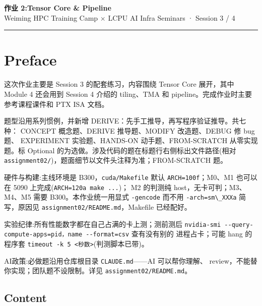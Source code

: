 \documentclass[11pt,a4paper,fontset=none]{ctexart}
\providecommand{\passthrough}[1]{#1}
\begin{document}
\begin{center}
  {\LARGE\bfseries 作业 2:Tensor Core \& Pipeline}\\[6pt]
  {\sffamily Weiming HPC Training Camp \(\times\) LCPU AI Infra Seminars
· Session 3 / 4}
\end{center}

\vspace{0.5em}
\hrule
\vspace{1em}

\setcounter{section}{-1}

\section*{Preface}\label{preface}

这次作业主要是 Session 3 的配套练习，内容围绕 Tensor Core 展开，其中
Module 4 还会用到 Session 4 介绍的 tiling、TMA 和
pipeline。完成作业时主要参考课程课件和 PTX ISA 文档。

题型沿用系列惯例，并新增 DERIVE：先手工推导，再写程序验证推导。共七种：
CONCEPT 概念题、DERIVE 推导题、MODIFY 改造题、DEBUG 修 bug 题、
EXPERIMENT 实验题、HANDS-ON 动手题、FROM-SCRATCH 从零实现题。标 Optional
的为选做。涉及代码的题在标题行右侧标出文件路径(相对
\passthrough{\lstinline!assignment02/!})，题面细节以文件头注释为准；FROM-SCRATCH
题。

硬件与构建:主线环境是 B300，\passthrough{\lstinline!cuda/Makefile!} 默认
\passthrough{\lstinline!ARCH=100f!}；M0、M1 也可以在 5090
上完成(\passthrough{\lstinline!ARCH=120a make ...!})； M2 的判测纯
host，无卡可判；M3、M4、M5 需要 B300。本作业统一用显式
\passthrough{\lstinline!-gencode!} 而不用
\passthrough{\lstinline!-arch=sm\_XXXa!} 简写，原因见
\passthrough{\lstinline!assignment02/README.md!}，Makefile 已经配好。

实验纪律:所有性能数字都在自己占满的卡上测；测前测后
\passthrough{\lstinline!nvidia-smi --query-compute-apps=pid，name --format=csv!}
查有没有别的 进程占卡；可能 hang 的程序套
\passthrough{\lstinline!timeout -k 5 <秒数>!}(判测脚本已带)。

AI政策:必做题沿用仓库根目录 \passthrough{\lstinline!CLAUDE.md!}------AI
可以帮你理解、 review，不能替你实现；团队题不设限制。详见
\passthrough{\lstinline!assignment02/README.md!}。

\subsection*{Content}\label{content}
\end{document}
